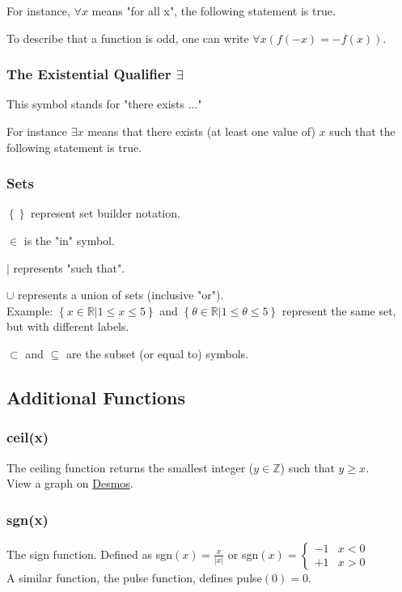 \documentclass{article}
\begin{document}
For instance, $\forall x$ means "for all x", the following statement is true.

To describe that a function is odd, one can write $\forall x \left(f\left(-x\right) = -f\left(x\right)\right)$.

\subsubsection{\texorpdfstring{The Existential Qualifier $\exists$}{The Existential Qualifier}}
This symbol stands for "there exists ..."

For instance $\exists x$ means that there exists (at least one value of) $x$ such that the following statement is true.

\subsubsection{Sets}
$\left\{\right\}$ represent set builder notation.

$\in$ is the "in" symbol.

$|$ represents "such that".

$\cup$ represents a union of sets (inclusive "or").\\
Example: $\left\{x \in \mathbb{R} | 1 \le x \le 5 \right\}$ and $\left\{\theta \in \mathbb{R} | 1 \le \theta \le 5 \right\}$ represent the same set, but with different labels.

$\subset$ and $\subseteq$ are the subset (or equal to) symbols.

\subsection{Additional Functions}
\subsubsection{ceil(x)}
The ceiling function returns the smallest integer ($y\in\mathbb{Z}$) such that $y \ge x$.\\
View a graph on \href{https://www.desmos.com/calculator/cpay9r9g5w}{Desmos}.

\subsubsection{sgn(x)}
The sign function. Defined as
sgn$(x) = \frac{x}{|x|}$ or sgn$(x) = \begin{cases}
    -1 &x<0\\
    +1 &x>0
\end{cases}$\\
A similar function, the pulse function, defines pulse$(0)=0$.
\end{document}
